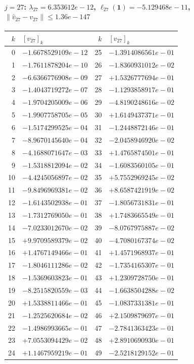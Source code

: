 \documentclass[11pt]{article}
\begin{document}
\paragraph{$j = 27$: $\lambda_{27} = 6.353612e-12$, \quad $\ell_{27}(\mathbf{1}) = -5.129468e-11$, \quad $\|\hat v_{27} - v_{27}\| \leq 1.36e-147$}
\begin{center}
{\footnotesize
\begin{tabular}{r@{\;\;}l@{\quad}r@{\;\;}l}
\toprule
$k$ & $[v_{27}]_k$ & $k$ & $[v_{27}]_k$ \\
\midrule
0 & $-1.6678529109e-12$ & 25 & $-1.3914086561e-01$ \\
1 & $-1.7611878204e-10$ & 26 & $-1.8360931012e-02$ \\
2 & $-6.6366776908e-09$ & 27 & $+1.5326777694e-01$ \\
3 & $-1.4043719272e-07$ & 28 & $-1.1293858917e-01$ \\
4 & $-1.9704205009e-06$ & 29 & $-4.8190248616e-02$ \\
5 & $-1.9907758705e-05$ & 30 & $+1.6149437371e-01$ \\
6 & $-1.5174299525e-04$ & 31 & $-1.2448872146e-01$ \\
7 & $-8.9670145640e-04$ & 32 & $-2.0458946920e-02$ \\
8 & $-4.1688071647e-03$ & 33 & $+1.4765874501e-01$ \\
9 & $-1.5318812094e-02$ & 34 & $-1.6083560105e-01$ \\
10 & $-4.4245056897e-02$ & 35 & $+5.7552969245e-02$ \\
11 & $-9.8496969381e-02$ & 36 & $+8.6587421919e-02$ \\
12 & $-1.6143502938e-01$ & 37 & $-1.8056731831e-01$ \\
13 & $-1.7312769050e-01$ & 38 & $+1.7483665549e-01$ \\
14 & $-7.0233012670e-02$ & 39 & $-8.0767975887e-02$ \\
15 & $+9.9709589379e-02$ & 40 & $-4.7080167374e-02$ \\
16 & $+1.4767149466e-01$ & 41 & $+1.4571968937e-01$ \\
17 & $-1.8046111286e-02$ & 42 & $-1.7354165307e-01$ \\
18 & $-1.5369603823e-01$ & 43 & $+1.2309728750e-01$ \\
19 & $-8.2515820559e-03$ & 44 & $-1.6638504288e-02$ \\
20 & $+1.5338811466e-01$ & 45 & $-1.0837331381e-01$ \\
21 & $-1.2525620684e-02$ & 46 & $+2.1509879697e-01$ \\
22 & $-1.4986993665e-01$ & 47 & $-2.7841363423e-01$ \\
23 & $+7.0553094429e-02$ & 48 & $+2.8910690930e-01$ \\
24 & $+1.1467959219e-01$ & 49 & $-2.5218129152e-01$ \\
\bottomrule
\end{tabular}
}
\end{center}
\end{document}

